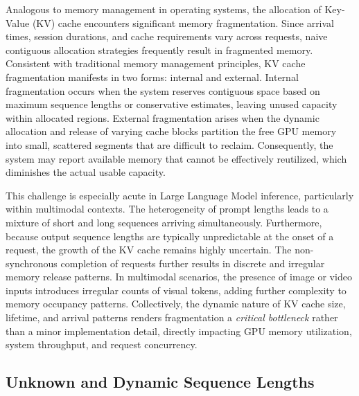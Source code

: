 \documentclass[10pt, a4paper]{article}
\begin{document}

Analogous to memory management in operating systems, the allocation of Key-Value (KV) cache encounters significant memory fragmentation. Since arrival times, session durations, and cache requirements vary across requests, naive contiguous allocation strategies frequently result in fragmented memory. Consistent with traditional memory management principles, KV cache fragmentation manifests in two forms: internal and external. Internal fragmentation occurs when the system reserves contiguous space based on maximum sequence lengths or conservative estimates, leaving unused capacity within allocated regions. External fragmentation arises when the dynamic allocation and release of varying cache blocks partition the free GPU memory into small, scattered segments that are difficult to reclaim. Consequently, the system may report available memory that cannot be effectively reutilized, which diminishes the actual usable capacity.

This challenge is especially acute in Large Language Model inference, particularly within multimodal contexts. The heterogeneity of prompt lengths leads to a mixture of short and long sequences arriving simultaneously. Furthermore, because output sequence lengths are typically unpredictable at the onset of a request, the growth of the KV cache remains highly uncertain. The non-synchronous completion of requests further results in discrete and irregular memory release patterns. In multimodal scenarios, the presence of image or video inputs introduces irregular counts of visual tokens, adding further complexity to memory occupancy patterns. Collectively, the dynamic nature of KV cache size, lifetime, and arrival patterns renders fragmentation a \textit{critical bottleneck} rather than a minor implementation detail, directly impacting GPU memory utilization, system throughput, and request concurrency.

\subsection{Unknown and Dynamic Sequence Lengths}

\end{document}
